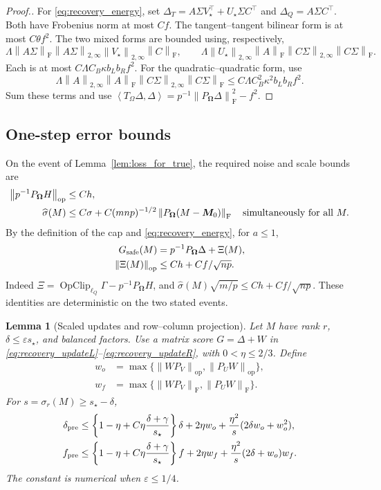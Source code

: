 \documentclass[numsec,webpdf,modern,large,namedate]{oup-authoring-template}
\theoremstyle{plain}
\newtheorem{slemma}{Lemma}%
\theoremstyle{remark}
\newcommand{\M}{\bm{M}}
\newcommand{\bOmega}{\bm{\Omega}}
\providecommand{\op}{\mathrm{op}}
\providecommand{\F}{\mathrm{F}}
\providecommand{\PP}{P_{\bOmega}}
\providecommand{\TT}{T_\Omega}
\providecommand{\norm}[1]{\left\|#1\right\|}
\providecommand{\inner}[2]{\left\langle #1,#2\right\rangle}
\DeclareMathOperator{\Clip}{OpClip}
\newif\ifmarkchanges
\newenvironment{revision}{\begingroup\ifmarkchanges\color{red}\fi}{\endgroup}
\begin{document}
\begin{revision}
\begin{proof}[Proof.]
For \eqref{eq:recovery_energy}, set
$\Delta_T=A\Sigma V_\star^\top+U_\star\Sigma C^\top$ and
$\Delta_Q=A\Sigma C^\top$.  Both have Frobenius norm at most $Cf$.
The tangent--tangent bilinear form is at most $C\theta f^2$.
The two mixed forms are bounded using, respectively,
\[
 \Lambda\norm{A\Sigma}_\F\norm{A\Sigma}_{2,\infty}
 \norm{V_\star}_{2,\infty}\norm{C}_\F,
 \qquad
 \Lambda\norm{U_\star}_{2,\infty}\norm{A}_\F
 \norm{C\Sigma}_{2,\infty}\norm{C\Sigma}_\F.
\]
Each is at most $C\Lambda C_B\kappa b_Lb_R f^2$.
For the quadratic--quadratic form, use
\[
 \Lambda\norm{A}_{2,\infty}\norm{A}_\F
 \norm{C\Sigma}_{2,\infty}\norm{C\Sigma}_\F
 \le C\Lambda C_B^2\kappa^2 b_Lb_R f^2.
\]
Sum these terms and use
$\inner{\TT\Delta}{\Delta}=p^{-1}\norm{\PP\Delta}_\F^2-f^2$.
\end{proof}

\subsection{One-step error bounds}
On the event of Lemma~\ref{lem:loss_for_true}, the required noise and scale
bounds are
\begin{align}
 \norm{p^{-1}\PP H}_\op&\le C h,\label{eq:recovery_noiseevent}\\
 \widehat\sigma(M)&\le C\sigma+
 C(mnp)^{-1/2}\norm{\PP(M-\M_0)}_\F
 \quad\hbox{simultaneously for all }M.\label{eq:recovery_scaleevent}
\end{align}
By the definition of the cap and \eqref{eq:recovery_energy}, for $a\le1$,
\begin{align}
 G_{\rm safe}(M)&=p^{-1}\PP\Delta+\Xi(M),\label{eq:recovery_decomp}\\
 \norm{\Xi(M)}_\op&\le C h+C f/\sqrt{np}.\label{eq:recovery_Xi}
\end{align}
Indeed $\Xi=\Clip_{\ell_Q}\Gamma-p^{-1}\PP H$, and
$\widehat\sigma(M)\sqrt{m/p}\le C h+C f/\sqrt{np}$.
These identities are deterministic on the two stated events.

\begin{slemma}[Scaled updates and row--column projection]
\label{lem:rsm_inexact_scaled_update}
Let $M$ have rank $r$, $\delta\le\varepsilon s_\star$, and balanced factors.
Use a matrix score $G=\Delta+W$ in
\eqref{eq:recovery_updateL}--\eqref{eq:recovery_updateR}, with $0<\eta\le2/3$.
Define
\begin{align*}
 w_o&=\max\{\norm{W P_V}_\op,\norm{P_U W}_\op\},\\
 w_f&=\max\{\norm{W P_V}_\F,\norm{P_U W}_\F\}.
\end{align*}
For $s=\sigma_r(M)\ge s_\star-\delta$,
\begin{align}
 \delta_{\rm pre} &\le
 \left\{1-\eta+C\eta\frac{\delta+\gamma}{s_\star}\right\}\delta
 +2\eta w_o+\frac{\eta^2}{s}(2\delta w_o+w_o^2),\label{eq:recovery_op-full}\\
 f_{\rm pre} &\le
 \left\{1-\eta+C\eta\frac{\delta+\gamma}{s_\star}\right\}f
 +2\eta w_f+\frac{\eta^2}{s}(2\delta+w_o)w_f.\label{eq:recovery_f-full}
\end{align}
The constant is numerical when $\varepsilon\le1/4$.


\end{slemma}
\end{revision}
\end{document}

